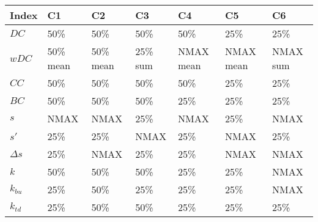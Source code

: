 \begin{table}[ht]
\centering
\begin{tabular}{lllllll}
  \hline
Index & C1 & C2 & C3 & C4 & C5 & C6 \\ 
  \hline
\(\displaystyle DC \) & {\color[HTML]{00D768} 50\% } & {\color[HTML]{EF2A00} 50\% } & {\color[HTML]{0051D7} 50\% } & {\color[HTML]{6200D7} 50\% } & {\color{orange} 25\% } & {\color[HTML]{9B9B9B} 25\% } \\ 
\(\displaystyle wDC \) &   {\color[HTML]{EF2A00} 50\% mean} & {\color[HTML]{00D768} 50\% mean} & {\color[HTML]{0051D7} 25\% sum} & {\color{orange} NMAX mean} & {\color[HTML]{6200D7} NMAX mean} & {\color[HTML]{9B9B9B} NMAX sum} \\ 
\(\displaystyle CC \) &   {\color[HTML]{00D768} 50\% } & {\color[HTML]{EF2A00} 50\% } & {\color[HTML]{0051D7} 50\% } & {\color[HTML]{6200D7} 50\% } & {\color{orange} 25\% } & {\color[HTML]{9B9B9B} 25\% } \\ 
\(\displaystyle BC \) &   {\color[HTML]{00D768} 50\% } & {\color[HTML]{0051D7} 50\% } & {\color[HTML]{EF2A00} 50\% } & {\color{orange} 25\% } & {\color[HTML]{6200D7} 25\% } & {\color[HTML]{9B9B9B} 25\% } \\ 
\(\displaystyle s \) &   {\color[HTML]{00D768} NMAX } & {\color[HTML]{EF2A00} NMAX } & {\color[HTML]{0051D7} 25\% } & {\color{orange} NMAX } & {\color[HTML]{6200D7} 25\% } & {\color[HTML]{9B9B9B} NMAX } \\ 
\(\displaystyle s' \) &   {\color[HTML]{EF2A00} 25\% } & {\color[HTML]{0051D7} 25\% } & {\color[HTML]{00D768} NMAX } & {\color[HTML]{6200D7} 25\% } & {\color{orange} NMAX } & {\color[HTML]{9B9B9B} 25\% } \\ 
\(\displaystyle \Delta s \) &   {\color[HTML]{00D768} 25\% } & {\color[HTML]{EF2A00} NMAX } & {\color[HTML]{0051D7} 25\% } & {\color[HTML]{6200D7} 25\% } & {\color{orange} NMAX } & {\color[HTML]{9B9B9B} NMAX } \\ 
\(\displaystyle k \) &   {\color[HTML]{00D768} 50\% } & {\color[HTML]{EF2A00} 50\% } & {\color[HTML]{0051D7} 50\% } & {\color[HTML]{6200D7} 25\% } & {\color{orange} 25\% } & {\color[HTML]{9B9B9B} NMAX } \\ 
\(\displaystyle k_{bu} \) &   {\color[HTML]{00D768} 25\% } & {\color[HTML]{EF2A00} 50\% } & {\color[HTML]{0051D7} 25\% } & {\color[HTML]{6200D7} 25\% } & {\color{orange} 25\% } & {\color[HTML]{9B9B9B} NMAX } \\ 
\(\displaystyle k_{td} \) &   {\color[HTML]{EF2A00} 25\% } & {\color[HTML]{00D768} 50\% } & {\color[HTML]{0051D7} 50\% } & {\color[HTML]{6200D7} 25\% } & {\color{orange} 25\% } & {\color[HTML]{9B9B9B} 25\% } \\ 

\end{tabular}
\end{table}
